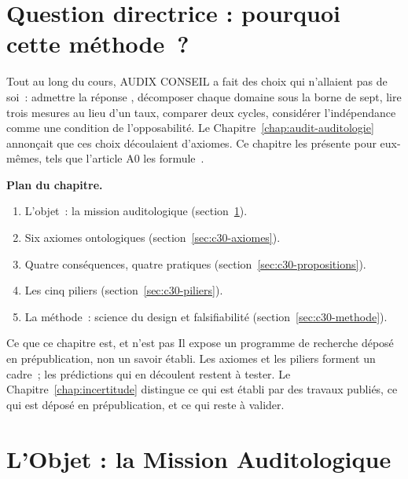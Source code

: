 \bigskip

\section*{Question directrice : pourquoi cette méthode~?}

Tout au long du cours, AUDIX CONSEIL a fait des choix qui n'allaient pas de
soi~: admettre la réponse \NEK{}, décomposer chaque domaine sous la borne de
sept, lire trois mesures au lieu d'un taux, comparer deux cycles,
considérer l'indépendance comme une condition de l'opposabilité. Le
Chapitre~\ref{chap:audit-auditologie} annonçait que ces choix découlaient
d'axiomes. Ce chapitre les présente pour eux-mêmes, tels que l'article A0
les formule~\cite{minka2026auditologie}.

\medskip
\textbf{Plan du chapitre.}
\begin{enumerate}
    \item L'objet~: la mission auditologique (section~\ref{sec:c30-objet}).
    \item Six axiomes ontologiques (section~\ref{sec:c30-axiomes}).
    \item Quatre conséquences, quatre pratiques (section~\ref{sec:c30-propositions}).
    \item Les cinq piliers (section~\ref{sec:c30-piliers}).
    \item La méthode~: science du design et falsifiabilité (section~\ref{sec:c30-methode}).
\end{enumerate}

\begin{boiteRemarque}{Ce que ce chapitre est, et n'est pas}
Il expose un programme de recherche déposé en prépublication, non un
savoir établi. Les axiomes et les piliers forment un cadre~; les
prédictions qui en découlent restent à tester. Le
Chapitre~\ref{chap:incertitude} distingue ce qui est établi par des travaux
publiés, ce qui est déposé en prépublication, et ce qui reste à valider.
\end{boiteRemarque}

\separateur

\section{L'Objet : la Mission Auditologique}
\label{sec:c30-objet}

